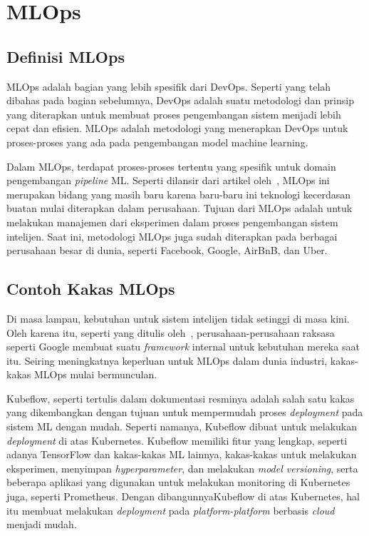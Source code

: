 \section{MLOps}


\subsection{Definisi MLOps}

MLOps adalah bagian yang lebih spesifik dari DevOps. 
Seperti yang telah dibahas pada bagian sebelumnya, DevOps adalah suatu metodologi dan prinsip yang diterapkan untuk membuat proses pengembangan sistem menjadi lebih cepat dan efisien. 
MLOps adalah metodologi yang menerapkan DevOps untuk proses-proses yang ada pada pengembangan model machine learning.

Dalam MLOps, terdapat proses-proses tertentu yang spesifik untuk domain pengembangan \textit{pipeline} ML.\@
Seperti dilansir dari artikel oleh~\cite{mlops}, MLOps ini merupakan bidang yang masih baru karena baru-baru ini teknologi kecerdasan buatan mulai diterapkan dalam perusahaan.
Tujuan dari MLOps adalah untuk melakukan manajemen dari eksperimen dalam proses pengembangan sistem intelijen.
Saat ini, metodologi MLOps juga sudah diterapkan pada berbagai perusahaan besar di dunia, seperti Facebook, Google, AirBnB, dan Uber.

\subsection{Contoh Kakas MLOps}

Di masa lampau, kebutuhan untuk sistem intelijen tidak setinggi di masa kini. 
Oleh karena itu, seperti yang ditulis oleh~\cite{mlops}, perusahaan-perusahaan raksasa seperti Google membuat suatu \textit{framework} internal untuk kebutuhan mereka saat itu.
Seiring meningkatnya keperluan untuk MLOps dalam dunia industri, kakas-kakas MLOps mulai bermunculan.

Kubeflow, seperti tertulis dalam dokumentasi resminya adalah salah satu kakas yang dikembangkan dengan tujuan untuk mempermudah proses \textit{deployment} pada sistem ML dengan mudah.
Seperti namanya, Kubeflow dibuat untuk melakukan \textit{deployment} di atas Kubernetes.
Kubeflow memiliki fitur yang lengkap, seperti adanya TensorFlow dan kakas-kakas ML lainnya, kakas-kakas untuk melakukan eksperimen, menyimpan \textit{hyperparameter}, dan melakukan \textit{model versioning}, serta beberapa aplikasi yang digunakan untuk melakukan monitoring di Kubernetes juga, seperti Prometheus.
Dengan dibangunnyaKubeflow di atas Kubernetes, hal itu membuat melakukan  \textit{deployment} pada \textit{platform-platform} berbasis \textit{cloud} menjadi mudah.

